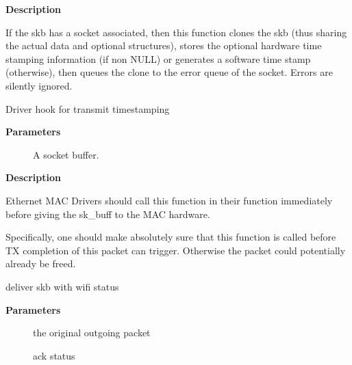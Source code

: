 \documentclass[a4paper,8pt,english]{sphinxmanual}
\begin{document}
\textbf{Description}

If the skb has a socket associated, then this function clones the
skb (thus sharing the actual data and optional structures), stores
the optional hardware time stamping information (if non NULL) or
generates a software time stamp (otherwise), then queues the clone
to the error queue of the socket.  Errors are silently ignored.

\begin{fulllineitems}
\label{networking/kapi:c.skb_tx_timestamp}
Driver hook for transmit timestamping

\end{fulllineitems}


\textbf{Parameters}
\begin{description}
\item[{}] \leavevmode
A socket buffer.

\end{description}

\textbf{Description}

Ethernet MAC Drivers should call this function in their 
function immediately before giving the sk\_buff to the MAC hardware.

Specifically, one should make absolutely sure that this function is
called before TX completion of this packet can trigger.  Otherwise
the packet could potentially already be freed.

\begin{fulllineitems}
\label{networking/kapi:c.skb_complete_wifi_ack}
deliver skb with wifi status

\end{fulllineitems}


\textbf{Parameters}
\begin{description}
\item[{}] \leavevmode
the original outgoing packet

\item[{}] \leavevmode
ack status

\end{description}
\end{document}
